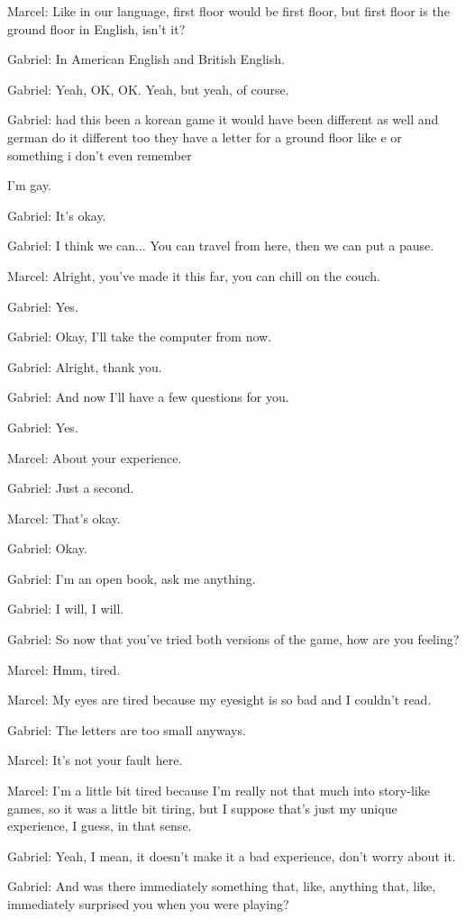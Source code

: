 Marcel: Like in our language, first floor would be first floor, but first floor is the ground floor in English, isn't it?

Gabriel: In American English and British English.

Gabriel: Yeah, OK, OK. Yeah, but yeah, of course.

Gabriel: had this been a korean game it would have been different as well and german do it different too they have a letter for a ground floor like e or something i don't even remember

I'm gay.

Gabriel: It's okay.

Gabriel: I think we can... You can travel from here, then we can put a pause.

Marcel: Alright, you've made it this far, you can chill on the couch.

Gabriel: Yes.

Gabriel: Okay, I'll take the computer from now.

Gabriel: Alright, thank you.

Gabriel: And now I'll have a few questions for you.

Gabriel: Yes.

Marcel: About your experience.

Gabriel: Just a second.

Marcel: That's okay.

Gabriel: Okay.

Gabriel: I'm an open book, ask me anything.

Gabriel: I will, I will.

Gabriel: So now that you've tried both versions of the game, how are you feeling?

Marcel: Hmm, tired.

Marcel: My eyes are tired because my eyesight is so bad and I couldn't read.

Gabriel: The letters are too small anyways.

Marcel: It's not your fault here.

Marcel: I'm a little bit tired because I'm really not that much into story-like games, so it was a little bit tiring, but I suppose that's just my unique experience, I guess, in that sense.

Gabriel: Yeah, I mean, it doesn't make it a bad experience, don't worry about it.

Gabriel: And was there immediately something that, like, anything that, like, immediately surprised you when you were playing?

